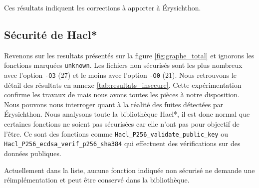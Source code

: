 Ces résultats indiquent les corrections à apporter à Érysichthon.

\subsection*{Sécurité de Hacl*}

Revenons sur les resultats présentés sur la figure \ref{fig:graphe_total} et ignorons les fonctions marquées \texttt{unknown}. Les fichiers non sécurisés sont les plus nombreux avec l'option \texttt{-O3} (27) et le moins avec l'option \texttt{-O0} (21). Nous retrouvons le détail des résultats en annexe \ref{tab:resultats_insecure}. Cette expérimentation confirme les travaux de \citeauthor{schneider2024breakingbadcompilersbreak} mais nous avons toutes les pièces à notre disposition. Nous pouvons nous interroger quant à la réalité des fuites détectées par Érysichthon. Nous analysons toute la bibliothèque Hacl*, il est donc normal que certaines fonctions ne soient pas sécurisées car elle n'ont pas pour objectif de l'être. Ce sont des fonctions comme \texttt{Hacl\_P256\_validate\_public\_key} ou \texttt{Hacl\_P256\_ecdsa\_verif\_p256\_sha384} qui effectuent des vérifications sur des données publiques. 

\begin{CitationBox}
  Actuellement dans la liste, aucune fonction indiquée non sécurisé ne demande une réimplémentation et peut être conservé dans la bibliothèque.
\end{CitationBox}


